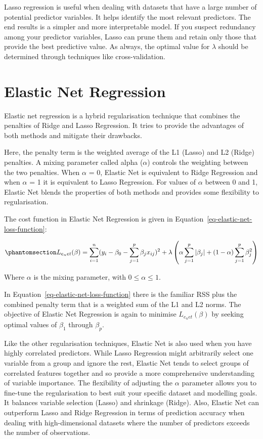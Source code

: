 \documentclass[
  letterpaper,
]{book}
\begin{document}
Lasso regression is useful when dealing with datasets that have a large
number of potential predictor variables. It helps identify the most
relevant predictors. The end results is a simpler and more interpretable
model. If you suspect redundancy among your predictor variables, Lasso
can prune them and retain only those that provide the best predictive
value. As always, the optimal value for \(\lambda\) should be determined
through techniques like cross-validation.

\section{Elastic Net Regression}\label{elastic-net-regression}

Elastic net regression is a hybrid regularisation technique that
combines the penalties of Ridge and Lasso Regression. It tries to
provide the advantages of both methods and mitigate their drawbacks.

Here, the penalty term is the weighted average of the L1 (Lasso) and L2
(Ridge) penalties. A mixing parameter called alpha (\(\alpha\)) controls
the weighting between the two penalties. When \(\alpha\) = 0, Elastic
Net is equivalent to Ridge Regression and when \(\alpha\) = 1 it is
equivalent to Lasso Regression. For values of \(\alpha\) between 0 and
1, Elastic Net blends the properties of both methods and provides some
flexibility to regularisation.

The cost function in Elastic Net Regression is given in
Equation~\ref{eq-elastic-net-loss-function}:

\begin{equation}\phantomsection\label{eq-elastic-net-loss-function}{L_{e_net}(\beta) = \sum_{i=1}^{n} (y_i - \beta_0 - \sum_{j=1}^{p} \beta_j x_{ij})^2 + \lambda \left( \alpha \sum_{j=1}^{p} |\beta_j| + (1 - \alpha) \sum_{j=1}^{p} \beta_j^2 \right)}\end{equation}

Where \(\alpha\) is the mixing parameter, with \(0 \leq \alpha \leq 1\).

In Equation~\ref{eq-elastic-net-loss-function} there is the familiar RSS
plus the combined penalty term that is a weighted sum of the L1 and L2
norms. The objective of Elastic Net Regression is again to minimise
\(L_{e_net}(\beta)\) by seeking optimal values of \(\beta_1\) through
\(\beta_p\).

Like the other regularisation techniques, Elastic Net is also used when
you have highly correlated predictors. While Lasso Regression might
arbitrarily select one variable from a group and ignore the rest,
Elastic Net tends to select groups of correlated features together and
so provide a more comprehensive understanding of variable importance.
The flexibility of adjusting the \(\alpha\) parameter allows you to
fine-tune the regularisation to best suit your specific dataset and
modelling goals. It balances variable selection (Lasso) and shrinkage
(Ridge). Also, Elastic Net can outperform Lasso and Ridge Regression in
terms of prediction accuracy when dealing with high-dimensional datasets
where the number of predictors exceeds the number of observations.
\end{document}
